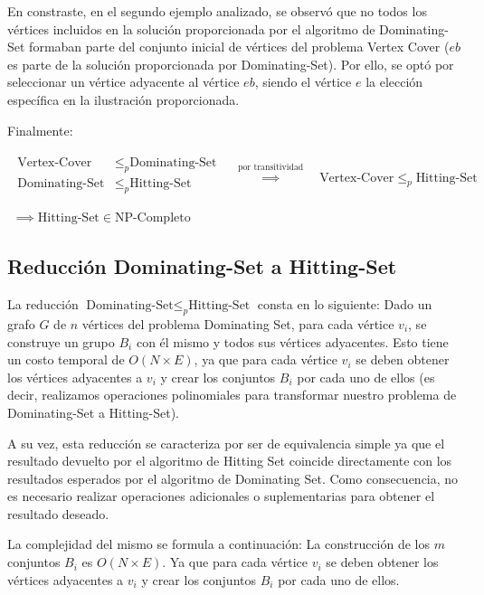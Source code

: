 En constraste, en el segundo ejemplo analizado, se observó que no todos los vértices incluidos en la solución proporcionada por el algoritmo de Dominating-Set formaban parte del conjunto inicial de vértices del problema Vertex Cover ($eb$ es parte de la solución proporcionada por Dominating-Set).
Por ello, se optó por seleccionar un vértice adyacente al vértice $eb$, siendo el vértice $e$ la elección específica en la ilustración proporcionada.

Finalmente:

\[
    \begin{array}{c}
        \begin{split}
            \text{Vertex-Cover}  & \leq _{p} \text{Dominating-Set} \\
            \text{Dominating-Set}  & \leq _{p} \text{Hitting-Set} \\
        \end{split}
        \quad \overset{ \text{por transitividad} }{ \implies  } \quad
        \text{Vertex-Cover}  \leq _{p} \text{Hitting-Set} \\ \\
        \implies \text{Hitting-Set} \in \text{NP-Completo}    
    \end{array}
\]

\subsection{Reducción Dominating-Set a Hitting-Set}

La reducción $\text{Dominating-Set} \leq_{p} \text{Hitting-Set}$ consta en lo siguiente:
Dado un grafo $G$ de $n$ vértices del problema Dominating Set, para cada vértice $v_{i}$, se construye un grupo $B_{i}$ con él mismo y todos sus vértices adyacentes. Esto tiene un costo temporal de $O(N \times E)$, ya que para cada vértice $v_{i}$ se deben obtener los vértices adyacentes a $v_{i}$ y crear los conjuntos $B_{i}$ por cada uno de ellos (es decir, realizamos operaciones polinomiales para transformar nuestro problema de Dominating-Set a Hitting-Set). 

A su vez, esta reducción se caracteriza por ser de equivalencia simple ya que el resultado devuelto por el algoritmo de Hitting Set coincide directamente con los resultados esperados por el algoritmo de Dominating Set. Como consecuencia, no es necesario realizar operaciones adicionales o suplementarias para obtener el resultado deseado.


La complejidad del mismo se formula a continuación:
La construcción de los $m$ conjuntos $B_{i}$ es $O(N \times E)$. Ya que para cada vértice $v_{i}$ se deben obtener los vértices adyacentes a $v_{i}$ y crear los conjuntos $B_{i}$ por cada uno de ellos. 


